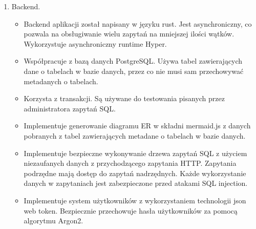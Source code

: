 \begin{enumerate}
    \item Backend.

    \begin{itemize}

        \item Backend aplikacji został napisany w języku rust. Jest
        asynchroniczny, co pozwala na obsługiwanie wielu zapytań na mniejszej
        ilości wątków. Wykorzystuje asynchroniczny runtime Hyper.

        \item Współpracuje z bazą danych PostgreSQL. Używa tabel
        zawierających dane o tabelach w bazie danych, przez co nie musi sam
        przechowywać metadanych o tabelach.

        \item Korzysta z transakcji. Są używane do testowania pisanych
        przez administratora zapytań SQL.

        \item Implementuje generowanie diagramu ER w składni mermaid.js z danych
        pobranych z tabel zawierających metadane o tabelach w bazie danych.

        \item Implementuje bezpieczne wykonywanie drzewa zapytań SQL z użyciem
        niezaufanych danych z przychodzącego zapytania HTTP. Zapytania podrzędne
        mają dostęp do zapytań nadrzędnych. Każde wykorzystanie danych w
        zapytaniach jest zabezpieczone przed atakami SQL injection.

        \item Implementuje system użytkowników z wykorzystaniem technologii json
        web token. Bezpiecznie przechowuje hasła użytkowników za pomocą
        algorytmu Argon2.

    \end{itemize}

\end{enumerate}
